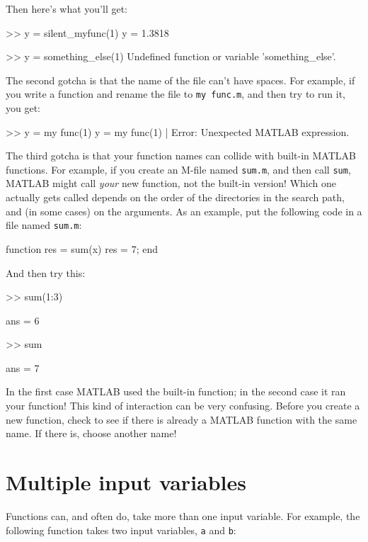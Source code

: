\documentclass[
]{book}
\numberwithin{Answer}{chapter}
\numberwithin{Exercise}{chapter}
\begin{document}
Then here's what you'll get:

\begin{code}
>> y = silent_myfunc(1)
y = 1.3818

>> y = something_else(1)
Undefined function or variable 'something_else'.
\end{code}

The second gotcha is that the name of the file can't have spaces.
For example, if you write a function and rename the file to {\tt my func.m},
and then try to run it, you get:

\begin{code}
>> y = my func(1)
 y = my func(1)
        |
Error: Unexpected MATLAB expression.
\end{code}

The third gotcha is that your function names can collide with built-in
MATLAB functions.  For example, if you create an M-file named {\tt sum.m}, and then call {\tt sum}, MATLAB might call {\em your} new
function, not the built-in version!  Which one actually gets called
depends on the order of the directories in the search path, and
(in some cases) on the arguments.  As an example, put the following
code in a file named {\tt sum.m}:


\begin{code}
function res = sum(x)
   res = 7;
end
\end{code}

And then try this:

\begin{code}
>> sum(1:3)

ans = 6

>> sum

ans = 7
\end{code}

In the first case MATLAB used the built-in function; in the second
case it ran your function!  This kind of interaction can be very
confusing.  Before you create a new function, check to see if there is
already a MATLAB function with the same name.  If there is, choose
another name!


\section{Multiple input variables}
\label{sect:hypotenuse}


Functions can, and often do, take more than one input variable.
For example, the following function takes two input variables,
{\tt a} and {\tt b}:
\end{document}
